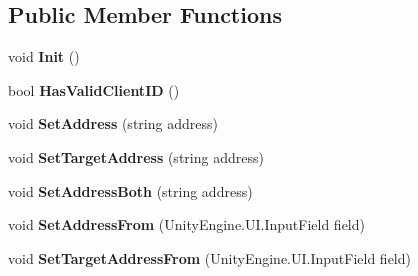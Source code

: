 \subsection*{Public Member Functions}
\begin{DoxyCompactItemize}
\item 
\hypertarget{class_skyrates_1_1_common_1_1_network_1_1_session_a0e3d58056a718d1201d1052d74c56758}{void {\bfseries Init} ()}\label{class_skyrates_1_1_common_1_1_network_1_1_session_a0e3d58056a718d1201d1052d74c56758}

\item 
\hypertarget{class_skyrates_1_1_common_1_1_network_1_1_session_a8064e0d263971a7deda7b74d1854b317}{bool {\bfseries Has\-Valid\-Client\-I\-D} ()}\label{class_skyrates_1_1_common_1_1_network_1_1_session_a8064e0d263971a7deda7b74d1854b317}

\item 
\hypertarget{class_skyrates_1_1_common_1_1_network_1_1_session_a21625ce49e9ec871f794e8d1c7f0245a}{void {\bfseries Set\-Address} (string address)}\label{class_skyrates_1_1_common_1_1_network_1_1_session_a21625ce49e9ec871f794e8d1c7f0245a}

\item 
\hypertarget{class_skyrates_1_1_common_1_1_network_1_1_session_a3cf672cdbcb6e71efdacd565e1040cf7}{void {\bfseries Set\-Target\-Address} (string address)}\label{class_skyrates_1_1_common_1_1_network_1_1_session_a3cf672cdbcb6e71efdacd565e1040cf7}

\item 
\hypertarget{class_skyrates_1_1_common_1_1_network_1_1_session_a9145cab59f183e2c6893819e4e623201}{void {\bfseries Set\-Address\-Both} (string address)}\label{class_skyrates_1_1_common_1_1_network_1_1_session_a9145cab59f183e2c6893819e4e623201}

\item 
\hypertarget{class_skyrates_1_1_common_1_1_network_1_1_session_ad868f465eb7d404b6a71a9b5b4c599d5}{void {\bfseries Set\-Address\-From} (Unity\-Engine.\-U\-I.\-Input\-Field field)}\label{class_skyrates_1_1_common_1_1_network_1_1_session_ad868f465eb7d404b6a71a9b5b4c599d5}

\item 
\hypertarget{class_skyrates_1_1_common_1_1_network_1_1_session_a1f9edda8349bb12ba5437fedb77db865}{void {\bfseries Set\-Target\-Address\-From} (Unity\-Engine.\-U\-I.\-Input\-Field field)}\label{class_skyrates_1_1_common_1_1_network_1_1_session_a1f9edda8349bb12ba5437fedb77db865}


\end{DoxyCompactItemize}
